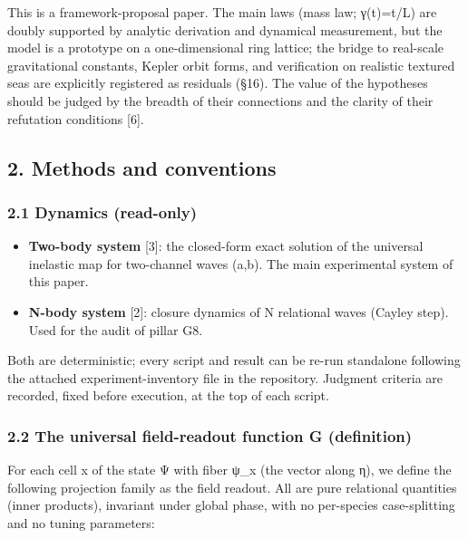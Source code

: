 \documentclass[
]{article}
\providecommand{\tightlist}{%
  \setlength{\itemsep}{0pt}\setlength{\parskip}{0pt}}
\begin{document}
This is a framework-proposal paper. The main laws (mass law; γ(t)=t/L)
are doubly supported by analytic derivation and dynamical measurement,
but the model is a prototype on a one-dimensional ring lattice; the
bridge to real-scale gravitational constants, Kepler orbit forms, and
verification on realistic textured seas are explicitly registered as
residuals (§16). The value of the hypotheses should be judged by the
breadth of their connections and the clarity of their refutation
conditions {[}6{]}.

\subsection{2. Methods and conventions}\label{methods-and-conventions}

\subsubsection{2.1 Dynamics (read-only)}\label{dynamics-read-only}

\begin{itemize}
\tightlist
\item
  \textbf{Two-body system} {[}3{]}: the closed-form exact solution of
  the universal inelastic map for two-channel waves (a,b). The main
  experimental system of this paper.
\item
  \textbf{N-body system} {[}2{]}: closure dynamics of N relational waves
  (Cayley step). Used for the audit of pillar G8.
\end{itemize}

Both are deterministic; every script and result can be re-run standalone
following the attached experiment-inventory file in the repository.
Judgment criteria are recorded, fixed before execution, at the top of
each script.

\subsubsection{2.2 The universal field-readout function G
(definition)}\label{the-universal-field-readout-function-g-definition}

For each cell x of the state Ψ with fiber ψ\_x (the vector along η), we
define the following projection family as the field readout. All are
pure relational quantities (inner products), invariant under global
phase, with no per-species case-splitting and no tuning parameters:
\end{document}
